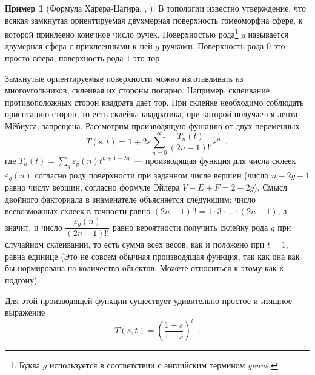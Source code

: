 \documentclass[a5paper]{article}
\theoremstyle{definition}
\newtheorem{example}{Пример}
\begin{document}
\begin{example}[Формула Харера-Цагира, \cite{lando}, \cite{pittel}]
\label{example:harer-zagier}
    В топологии известно утверждение, что всякая замкнутая ориентируемая
двухмерная поверхность гомеоморфна сфере, к которой приклеено конечное число
ручек. Поверхностью рода\footnote{Буква \( g \) используется в соответствии с
английским термином \textit{genus}.} \( g \) называется 
двумерная сфера с приклеенными к ней \( g \) ручками. Поверхность рода \( 0 \)
это просто сфера, поверхность рода \( 1 \) это тор. 

Замкнутые ориентируемые поверхности можно изготавливать из многоугольников,
склеивая их стороны попарно. Например, склеивание противоположных сторон
квадрата даёт тор. При склейке необходимо соблюдать ориентацию сторон, то есть
склейка квадратика, при которой получается лента Мёбиуса, запрещена. Рассмотрим производящую функцию от двух переменных
\[
    T(s, t) = 1 + 2 s \sum_{n = 0}^\infty \dfrac{T_n(t)}{(2n-1)!!} s^n \enspace
, 
\]
где \( T_n(t) = \sum_{g} \varepsilon_g(n) t^{n+1-2g} \)~--- производящая функция
для числа склеек \( \varepsilon_g(n) \) согласно роду поверхности при заданном
числе вершин (число \( n - 2g + 1 \) равно числу вершин, согласно формуле Эйлера
\( V-E+F = 2 - 2g \)).
Смысл двойного факториала в знаменателе объясняется следующим: число
всевозможных склеек в точности равно \( (2n-1)!! = 1 \cdot 3 \cdot \ldots \cdot
(2n-1) \), а значит, и число \( \dfrac{\varepsilon_g(n)}{(2n-1)!!} \) равно
вероятности получить склейку рода \( g \) при случайном склеивании, то есть
сумма всех весов, как и положено при \( t = 1 \), равна единице (Это не совсем
обычная производящая функция, так как она как бы нормирована на количество
объектов. Можете относиться к этому как к подгону). 

Для этой производящей функции существует удивительно простое и изящное выражение 
\[
    T(s, t) = \left(
        \dfrac{1+s}{1-s}
    \right)^t \enspace .
\]
\end{example}
\end{document}
